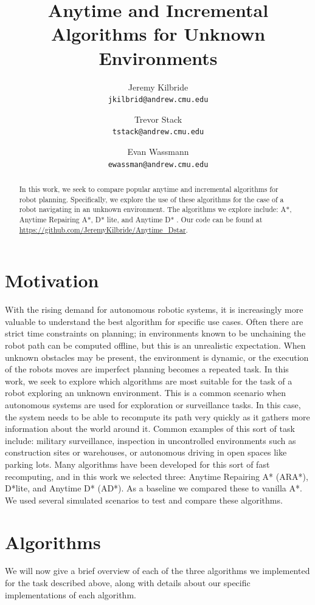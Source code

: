 \documentclass{article}
\title{Anytime and Incremental Algorithms for Unknown Environments}
\author{Jeremy Kilbride\\ \texttt{jkilbrid@andrew.cmu.edu} 
\and Trevor Stack \\
\texttt{tstack@andrew.cmu.edu}
\and Evan Wassmann\\
\texttt{ewassman@andrew.cmu.edu}}
\begin{document}
\maketitle

\begin{abstract}
    In this work, we seek to compare popular anytime and incremental algorithms for robot planning. Specifically, we explore the use of these algorithms for the case of a robot navigating in an unknown environment. The algorithms we explore include: A*, Anytime Repairing A*\cite{ara_star}, D* lite\cite{D_star_lite}, and Anytime D* \cite{anytimeD_star}. Our code can be found at \url{https://github.com/JeremyKilbride/Anytime_Dstar}.
\end{abstract}

\section{Motivation}
\quad With the rising demand for autonomous robotic systems, it is increasingly more valuable to understand the best algorithm for specific use cases. Often there are strict time constraints on planning; in environments known to be unchaining the robot path can be computed offline, but this is an unrealistic expectation. When unknown obstacles may be present, the environment is dynamic, or the execution of the robots moves are imperfect planning becomes a repeated task. In this work, we seek to explore which algorithms are most suitable for the task of a robot exploring an unknown environment. This is a common scenario when autonomous systems are used for exploration or surveillance tasks. In this case, the system needs to be able to recompute its path very quickly as it gathers more information about the world around it.  Common examples of this sort of task include: military surveillance, inspection in uncontrolled environments such as construction sites or warehouses, or autonomous driving in open spaces like parking lots. Many algorithms have been developed for this sort of fast recomputing, and in this work we selected three: Anytime Repairing A* (ARA*), D*lite, and Anytime D* (AD*). As a baseline we compared these to vanilla A*. We used several simulated scenarios to test and compare these algorithms. 

\section{Algorithms} \label{sec: Algos}
\quad We will now give a brief overview of each of the three algorithms we implemented for the task described above, along with details about our specific implementations of each algorithm.
\end{document}
